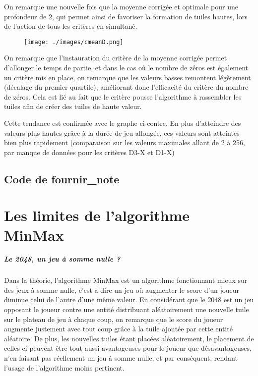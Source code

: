 \documentclass[a4paper]{report}
\begin{document}
On remarque une nouvelle fois que la moyenne corrigée et optimale pour une profondeur de 2, qui permet ainsi de favoriser la formation de tuiles hautes, lors de l’action de tous les critères en simultané.

\begin{figure}[h]
\begin{center}
\texttt{[image: ./images/cmeanD.png]}
\end{center}
\end{figure}

On remarque que l’instauration du critère de la moyenne corrigée permet d’allonger le temps de partie, et dans le cas où le nombre de zéros est également un critère mis en place, on remarque que les valeurs basses remontent légèrement (décalage du premier quartile), améliorant donc l’efficacité du critère du nombre de zéros. Cela est lié au fait que le critère pousse l’algorithme à rassembler les tuiles afin de créer des tuiles de haute valeur.

\begin{figure}[h!]
\null\hfill
{}
\hfill
{}
\hfill\null
\end{figure}

Cette tendance est confirmée avec le graphe ci-contre. En plus d’atteindre des valeurs plus hautes grâce à la durée de jeu allongée, ces valeurs sont atteintes bien plus rapidement (comparaison sur les valeurs maximales allant de 2 à 256, par manque de données pour les critères D3-X et D1-X) 

\section{Code de fournir\_note}








\chapter{Les limites de l’algorithme MinMax}
\paragraph{Le 2048, un jeu à somme nulle ?}
Dans la théorie, l’algorithme MinMax est un algorithme fonctionnant mieux sur des jeux à somme nulle, c’est-à-dire un jeu où augmenter le score d’un joueur diminue celui de l’autre d'une même valeur. En considérant que le 2048 est un jeu opposant le joueur contre une entité distribuant aléatoirement une nouvelle tuile sur le plateau de jeu à chaque coup, on remarque que le score du joueur augmente justement avec tout coup grâce à la tuile ajoutée par cette entité aléatoire. De plus, les nouvelles tuiles étant placées aléatoirement, le placement de celles-ci peuvent être tout aussi avantageuses pour le joueur que désavantageuses, n’en faisant pas réellement un jeu à somme nulle, et par conséquent, rendant l’usage de l’algorithme moins pertinent.
\end{document}
